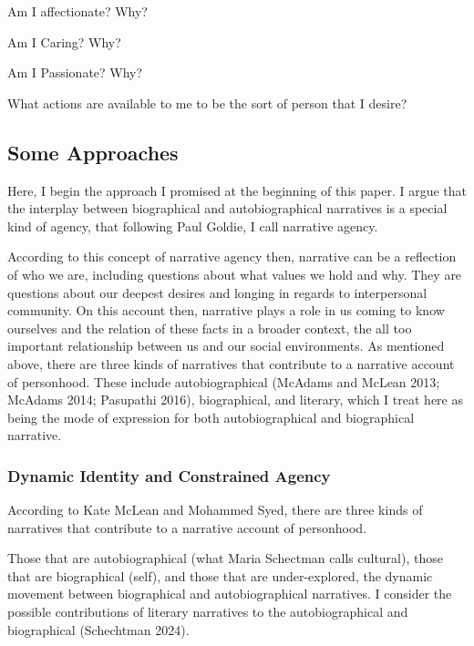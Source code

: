 \documentclass[
  letterpaper,
  DIV=11,
  numbers=noendperiod]{scrartcl}
\theoremstyle{remark}
\begin{document}
Am I affectionate? Why?

Am I Caring? Why?

Am I Passionate? Why?

What actions are available to me to be the sort of person that I desire?

\subsection{Some Approaches}\label{some-approaches}

Here, I begin the approach I promised at the beginning of this paper. I
argue that the interplay between biographical and autobiographical
narratives is a special kind of agency, that following Paul Goldie, I
call narrative agency.

According to this concept of narrative agency then, narrative can be a
reflection of who we are, including questions about what values we hold
and why. They are questions about our deepest desires and longing in
regards to interpersonal community. On this account then, narrative
plays a role in us coming to know ourselves and the relation of these
facts in a broader context, the all too important relationship between
us and our social environments. As mentioned above, there are three
kinds of narratives that contribute to a narrative account of
personhood. These include autobiographical (McAdams and McLean 2013;
McAdams 2014; Pasupathi 2016), biographical, and literary, which I treat
here as being the mode of expression for both autobiographical and
biographical narrative.

\subsubsection{Dynamic Identity and Constrained
Agency}\label{dynamic-identity-and-constrained-agency}

According to Kate McLean and Mohammed Syed, there are three kinds of
narratives that contribute to a narrative account of personhood.

Those that are autobiographical (what Maria Schectman calls cultural),
those that are biographical (self), and those that are under-explored,
the dynamic movement between biographical and autobiographical
narratives. I consider the possible contributions of literary narratives
to the autobiographical and biographical (Schechtman 2024).
\end{document}
